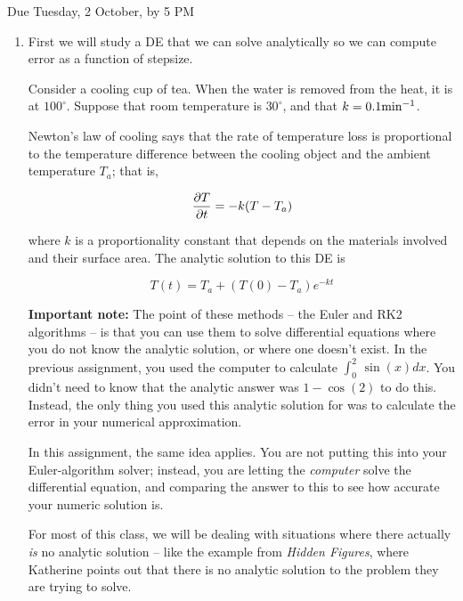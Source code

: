\documentclass[12pt]{article}
\def\PAR#1#2{ {{\partial #1}\over{\partial #2}} }
\begin{document}
\Large
\centerline{}
\centerline{Due Tuesday, 2 October, by 5 PM}
\normalsize

\begin{enumerate}
\item{

First we will study a DE that we can solve analytically so we can compute error as a function of stepsize.

Consider a cooling cup of tea. When the water is removed from the heat, it is at $100^\circ$. Suppose that room temperature is $30^\circ$, and that $k=0.1 {\rm {min}}^{-1}$.

Newton's law of cooling says that the rate of temperature loss is proportional to the temperature difference between the cooling object and the ambient temperature $T_a$; that is,

\begin{equation}
\PAR{T}{t} = -k(T-T_a)
\end{equation}

where $k$ is a proportionality constant that depends on the materials involved and their surface area. The analytic solution to this DE is

\begin{equation}
T(t) = T_a + (T(0) - T_a)e^{-kt}
\end{equation}
  
{\bf Important note:} The point of these methods -- the Euler and RK2 algorithms -- is that you can use them to solve differential equations where you do not know the analytic solution, or where one doesn't exist. In the previous assignment, you
used the computer to calculate $\int_0^2 \,\sin(x) dx$. You didn't need to know that the analytic answer was $1-\cos(2)$ to do this. Instead, the only thing you used this analytic solution for was to calculate the error in your numerical approximation.

In this assignment, the same idea applies. You are not putting this into your Euler-algorithm solver; instead, you are letting the {\it computer} solve the differential equation, and comparing the answer to this to see how accurate your numeric solution is.

For most of this class, we will be dealing with situations where there actually {\it is} no analytic solution -- like the example from {\it Hidden Figures}, where Katherine points out that there is no analytic solution to the problem they are trying to solve.


\begin{enumerate}


\end{enumerate}}
\end{enumerate}
\end{document}
